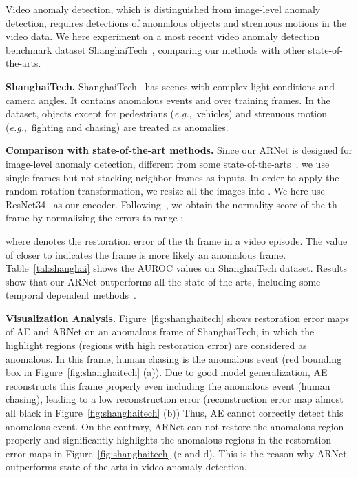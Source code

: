 \documentclass[journal]{IEEEtran}
\begin{document}
Video anomaly detection, which is distinguished from image-level anomaly detection, requires detections of anomalous objects and strenuous motions in the video data. We here experiment on a most recent video anomaly detection benchmark dataset ShanghaiTech~\cite{luo2017revisit}, comparing our methods with other state-of-the-arts.

\noindent\textbf{ShanghaiTech.} ShanghaiTech~\cite{luo2017revisit} has  scenes with complex light conditions and camera angles. It contains  anomalous events and over  training frames. In the dataset, objects except for pedestrians (\emph{e.g.},~vehicles) and strenuous motion (\emph{e.g.},~fighting and chasing) are treated as anomalies. 

\noindent\textbf{Comparison with state-of-the-art methods.} Since our ARNet is designed for image-level anomaly detection, different from some state-of-the-arts~\cite{luo2017revisit,zhao2017spatio,gong2019memorizing}, we use single frames but not stacking neighbor frames as inputs. In order to apply the random rotation transformation, we resize all the images into . We here use ResNet34~\cite{he2016deep} as our encoder. Following~\cite{hasan2016learning,luo2017revisit,gong2019memorizing}, we obtain the normality score  of the th frame by normalizing the errors to range :


where  denotes the restoration error of the th frame in a video episode. The value of  closer to  indicates the frame is more likely an anomalous frame. Table~\ref{tal:shanghai} shows the AUROC values on ShanghaiTech dataset. Results show that our ARNet outperforms all the state-of-the-arts, including some temporal dependent methods~\cite{luo2017revisit,zhao2017spatio,gong2019memorizing}.

\noindent\textbf{Visualization Analysis.} Figure~\ref{fig:shanghaitech} shows restoration error maps of AE and ARNet on an anomalous frame of ShanghaiTech, in which the highlight regions (regions with high restoration error) are considered as anomalous. In this frame, human chasing is the anomalous event (red bounding box in Figure~\ref{fig:shanghaitech} (a)). Due to good model generalization, AE reconstructs this frame properly even including the anomalous event (human chasing), leading to a low reconstruction error (reconstruction error map almost all black in Figure~\ref{fig:shanghaitech} (b)) Thus, AE cannot correctly detect this anomalous event. On the contrary, ARNet can not restore the anomalous region properly and significantly highlights the anomalous regions in the restoration error maps in Figure~\ref{fig:shanghaitech} (c and d). This is the reason why ARNet outperforms state-of-the-arts in video anomaly detection.

\ifCLASSOPTIONcaptionsoff
  \newpage
\fi
\end{document}
